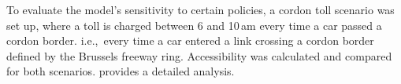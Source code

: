 To evaluate the model's sensitivity to certain policies, a cordon toll scenario was set up, where a toll is charged between 6 and 10\,am every time a car passed a cordon border. i.e.,\ every time a car entered a link crossing a cordon border defined by the Brussels freeway ring. Accessibility was calculated and compared for both scenarios.  \citet{RoederNagel2013SketchPlanningBrussels} provides a detailed analysis.

